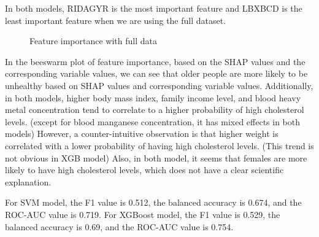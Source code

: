 \documentclass{article}
\begin{document}
In both models, RIDAGYR is the most important feature and LBXBCD is the least important feature when we are using the full dataset. 

\begin{figure}[!ht]
    \centering
    \qquad
    \caption{Feature importance with full data}
\end{figure}

In the beeswarm plot of feature importance, based on the SHAP values and the corresponding variable values, we can see that older people are more likely to be unhealthy based on SHAP values and corresponding variable values. Additionally, in both models, higher body mass index, family income level, and blood heavy metal concentration tend to correlate to a higher probability of high cholesterol levels. (except for blood manganese concentration, it has mixed effects in both models) However, a counter-intuitive observation is that higher weight is correlated with a lower probability of having high cholesterol levels. (This trend is not obvious in XGB model) Also, in both model, it seems that females are more likely to have high cholesterol levels, which does not have a clear scientific explanation.

For SVM model, the F1 value is 0.512, the balanced accuracy is 0.674, and the ROC-AUC value is 0.719. For XGBoost model, the F1 value is 0.529, the balanced accuracy is 0.69, and the ROC-AUC value is 0.754.
\end{document}
